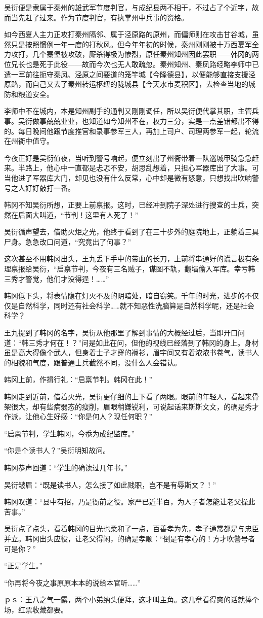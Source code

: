 吴衍便是隶属于秦州的雄武军节度判官，与成纪县两不相干，不过占了个近字，故而当先赶了过来。作为节度判官，有执掌州中兵事的资格。

如今西夏人主力正攻打秦州隔邻、属于泾原路的原州，而偏师则在攻击甘谷城，虽然只是按照惯例一年一度的打秋风。但今年年初的时候，秦州刚刚被十万西夏军全力攻打，几个寨堡被攻破，厮杀得极为惨烈，原任秦州知州因此罢职——韩冈的两位兄长也是死于此役——故而今次也无人敢疏忽。秦州知州、秦凤路经略李师中已遣一军前往扼守秦凤、泾原之间要道的笼竿城【今隆德县】，以便能够直接支援泾原路，而自己又去了秦州转运枢纽的陇城县【今天水市麦积区】，去检查当地的城防和粮道安全。

李师中不在城内，本是知州副手的通判又刚刚调任，所以吴衍便代掌其职，主管兵事。吴衍做事兢兢业业，也知道如今知州不在，权力三分，实是一点差错都出不得的。每日晚间他跟节度推官和录事参军三人，再加上司户、司理两参军一起，轮流在州衙中值守。

今夜正好是吴衍值夜，当听到警号响起，便立刻出了州衙带着一队巡城甲骑急急赶来。半路上，他心中一直都是忐忑不安，胡思乱想着，只担心军器库出了大事。可当他进了军器库大门，却见也没有什么反常，心中却是微有怒意，只想找出吹响警号之人好好敲打一番。

韩冈不知吴衍所想，正要上前禀报。这时，已经冲到院子深处进行搜查的士兵，突然在后面大叫道，“节判！这里有人死了！”

吴衍循声望去，借助火炬之光，他终于看到了在三十步外的庭院地上，正躺着三具尸身。急急改口问道，“究竟出了何事？”

这次甚至不用韩冈出头，王九丢下手中的带血的长刀，上前将串通好的谎言极有条理禀报给吴衍，“启禀节判，今夜有三名贼子，谋图不轨，翻墙偷入军库。幸亏韩三秀才警觉，他们才没得逞！……”

韩冈低下头，将表情隐在灯火不及的阴暗处，暗自窃笑。千年的时光，进步的不仅仅是自然科学，同时还有社会科学……就不知恶性洗脑算是自然科学呢，还是社会科学？

王九提到了韩冈的名字，吴衍从他那里了解到事情的大概经过后，当即开口问道：“韩三秀才何在！？”问是如此在问，但他的视线已经落到了韩冈的身上。身材虽是高大得像个武人，但身着士子才穿的襕衫，眉宇间又有着浓浓书卷气，读书人的相貌和气度，跟普通士兵截然不同，没什么人会错认。

韩冈上前，作揖行礼：“启禀节判。韩冈在此！”

韩冈走到近前，借着火光，吴衍更仔细的上下看了两眼。眼前的年轻人，看起来骨架很大，却有些病弱态的瘦削，眉眼稍嫌锐利，可说起话来斯斯文文，的确是秀才作派，让他心生好感：“你是何人？现任何职？”

“启禀节判，学生韩冈，今忝为成纪监库。”

“你是个读书人？”吴衍明知故问。

韩冈恭声回道：“学生的确读过几年书。”

吴衍皱眉：“既是读书人，怎么接了如此贱职，岂不是有辱斯文？！”

韩冈叹道：“县中有招，乃是衙前之役。家严已近半百，为人子者怎能让老父操此苦事。”

吴衍点了点头，看着韩冈的目光也柔和了一点，百善孝为先，孝子通常都是与忠臣并立。韩冈出头应役，让老父得闲，的确是孝顺：“倒是有孝心的！方才吹警号者可是你？”

“正是学生。”

“你再将今夜之事原原本本的说给本官听……”

ｐｓ：王八之气一露，两个小弟纳头便拜，这才叫主角。这几章看得爽的话就捧个场，红票收藏都要。

